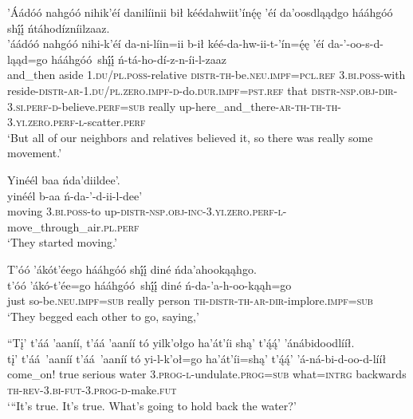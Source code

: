 \ea\label{ex:text6-12-1}
’Áádóó nahgóó nihik’éí danilíinii bił kéédahwiit’ínę́ę ’éí da’oosdląądgo hááhgóó shį́į́ ńtáhodízníilzaaz.\\
\gll ’áádóó	nahgóó	nihi-k’éí	da-ni-líin=ii	b-ił	kéé-da-hw-ii-t-’ín=ę́ę	’éí	da-’-oo-s-d-ląąd=go	hááhgóó~{shį́į́}	ń-tá-ho-dí-z-n-íi-l-zaaz\\
     and\_then	aside	1.\textsc{du}/\textsc{pl}.\textsc{poss}-relative	\textsc{distr}-\textsc{th}-be.\textsc{neu}.\textsc{impf}=\textsc{pcl}.\textsc{ref}	3.\textsc{bi}.\textsc{poss}-with	reside-\textsc{distr}-\textsc{ar}-1.\textsc{du}/\textsc{pl}.\textsc{zero}.\textsc{impf}-\textsc{d}-do.\textsc{dur}.\textsc{impf}=\textsc{pst}.\textsc{ref}	that	\textsc{distr}-\textsc{nsp}.\textsc{obj}-\textsc{dir}-3.\textsc{si}.\textsc{perf}-\textsc{d}-believe.\textsc{perf}=\textsc{sub}	really	up-here\_and\_there-\textsc{ar}-\textsc{th}-\textsc{th}-\textsc{th}-3.\textsc{yi}.\textsc{zero}.\textsc{perf}-\textsc{l}-scatter.\textsc{perf}\\
\glt `But all of our neighbors and relatives believed it, so there was really some movement.'
\z

\ea\label{ex:text6-12-2}
Yinéél baa ńda’diildee’.\\
\gll yinéél	b-aa	ń-da-’-d-ii-l-dee’\\
     moving	3.\textsc{bi}.\textsc{poss}-to	up-\textsc{distr}-\textsc{nsp}.\textsc{obj}-\textsc{inc}-3.\textsc{yi}.\textsc{zero}.\textsc{perf}-\textsc{l}-move\_through\_air.\textsc{pl}.\textsc{perf}\\
\glt `They started moving.'
\z

\ea\label{ex:text6-12-3}
T’óó ’ákót’éego hááhgóó shį́į́ diné ńda’ahookąąhgo.\\
\gll t’óó	’ákó-t’ée=go	hááhgóó~{shį́į́}	diné	ń-da-’a-h-oo-kąąh=go\\
     just	so-be.\textsc{neu}.\textsc{impf}=\textsc{sub}	really	person	\textsc{th}-\textsc{distr}-\textsc{th}-\textsc{ar}-\textsc{dir}-implore.\textsc{impf}=\textsc{sub}\\
\glt `They begged each other to go, saying,'
\z

\ea\label{ex:text6-12-4}
``Tį’ t’áá ’aaníí, t’áá ’aaníí tó yilk’ołgo ha’át’íi shą’ t’ą́ą́’ ’ánábidoodlííł.\\
\gll tį’	t’áá~{’aaníí}	t’áá~{’aaníí}	tó	yi-l-k’oł=go	ha’át’íi=shą’	t’ą́ą́’	’á-ná-bi-d-oo-d-lííł\\
     come\_on!	true	serious	water	3.\textsc{prog}-\textsc{l}-undulate.\textsc{prog}=\textsc{sub}	what=\textsc{intrg}	backwards	\textsc{th}-\textsc{rev}-3.\textsc{bi}-\textsc{fut}-3.\textsc{prog}-\textsc{d}-make.\textsc{fut}\\
\glt `“It's true. It's true. What's going to hold back the water?'
\z

